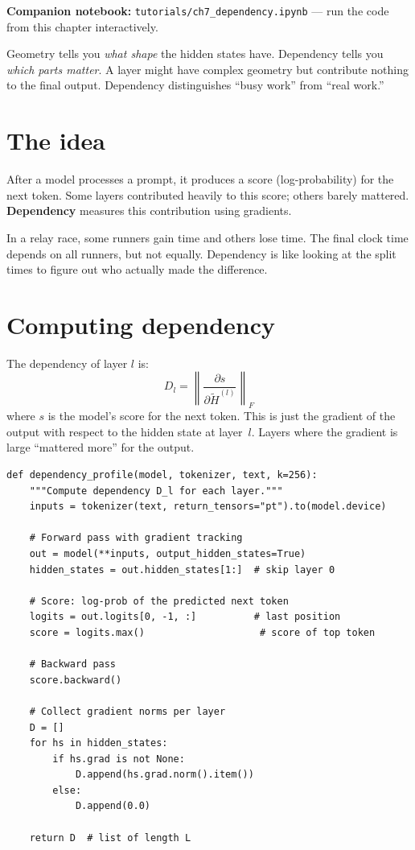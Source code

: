 \documentclass[11pt, twoside, openright]{memoir}
\newcommand{\notebook}[1]{%
  \begin{tcolorbox}[enhanced, colback=LBlue!30, colframe=Blue!60,
    left=4pt, right=4pt, top=3pt, bottom=3pt, boxrule=0.6pt, arc=2pt,
    before skip=6pt, after skip=10pt]
    {\small\sffamily\color{Navy} \textbf{Companion notebook:}
    \texttt{tutorials/#1} --- run the code from this chapter interactively.}
  \end{tcolorbox}%
}
\begin{document}
\notebook{ch7\_dependency.ipynb}

\begin{whycare}
Geometry tells you \emph{what shape} the hidden states have. Dependency tells
you \emph{which parts matter}. A layer might have complex geometry but
contribute nothing to the final output. Dependency distinguishes
``busy work'' from ``real work.''
\end{whycare}

\section{The idea}

After a model processes a prompt, it produces a score (log-probability) for
the next token. Some layers contributed heavily to this score; others barely
mattered. \textbf{Dependency} measures this contribution using gradients.

\begin{analogy}
In a relay race, some runners gain time and others lose time. The final
clock time depends on all runners, but not equally. Dependency is like
looking at the split times to figure out who actually made the difference.
\end{analogy}

\section{Computing dependency}

The dependency of layer $l$ is:
\[
  D_l = \left\|\frac{\partial s}{\partial \widetilde{H}^{(l)}}\right\|_F
\]
where $s$ is the model's score for the next token. This is just the
gradient of the output with respect to the hidden state at layer~$l$.
Layers where the gradient is large ``mattered more'' for the output.

\begin{lstlisting}[caption={Computing dependency profiles}]
def dependency_profile(model, tokenizer, text, k=256):
    """Compute dependency D_l for each layer."""
    inputs = tokenizer(text, return_tensors="pt").to(model.device)

    # Forward pass with gradient tracking
    out = model(**inputs, output_hidden_states=True)
    hidden_states = out.hidden_states[1:]  # skip layer 0

    # Score: log-prob of the predicted next token
    logits = out.logits[0, -1, :]          # last position
    score = logits.max()                    # score of top token

    # Backward pass
    score.backward()

    # Collect gradient norms per layer
    D = []
    for hs in hidden_states:
        if hs.grad is not None:
            D.append(hs.grad.norm().item())
        else:
            D.append(0.0)

    return D  # list of length L
\end{lstlisting}
\end{document}
